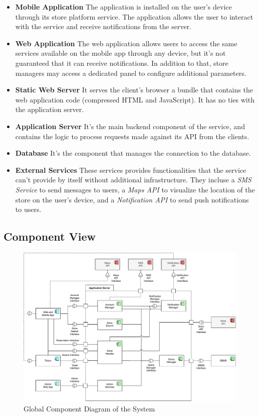 \begin{itemize}
    \item \textbf{Mobile Application} The application is installed on the user's device through its store platform service. The application allows the user to interact with the service and receive notifications from the server.
    \item \textbf{Web Application} The web application allows users to access the same services available on the mobile app through any device, but it's not guaranteed that it can receive notifications. In addition to that, store managers may access a dedicated panel to configure additional parameters.
    \item \textbf{Static Web Server} It serves the client's browser a bundle that contains the web application code (compressed HTML and JavaScript). It has no ties with the application server.
    \item \textbf{Application Server} It's the main backend component of the service, and contains the logic to process requests made against its API from the clients.
    \item \textbf{Database} It's the component that manages the connection to the database.
    \item \textbf{External Services} These services provides functionalities that the service can't provide by itself without additional infrastructure. They incluse a \emph{SMS Service} to send messages to users, a \emph{Maps API} to visualize the location of the store on the user's device, and a \emph{Notification API} to send push notifications to users.
\end{itemize}

\subsection{Component View}
\begin{figure}[H]
    \includegraphics[width=\linewidth]{images/draw.io/component.pdf}
    \caption{Global Component Diagram of the System}
    \label{fig:component}
\end{figure}

